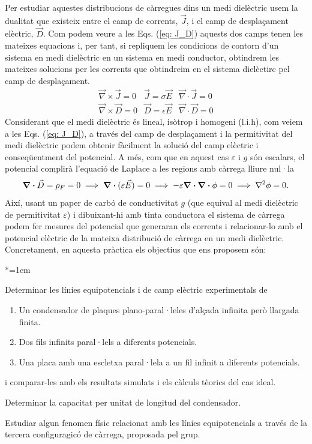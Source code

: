 \documentclass[11pt]{article}
\numberwithin{equation}{section}
\numberwithin{figure}{section}
\numberwithin{table}{section}
\begin{document}
Per estudiar aquestes distribucions de càrregues dins un medi dielèctric usem la dualitat que existeix entre el camp de corrents, $\vec{J}$, i el camp de desplaçament elèctric, $\vec{D}$. Com podem veure a les Eqs. (\ref{eq: J_D}) aquests dos camps tenen les mateixes equacions i, per tant, si repliquem les condicions de contorn d'un sistema en medi dielèctric en un sistema en medi conductor, obtindrem les mateixes solucions per les corrents que obtindreim en el sistema dielèctirc pel camp de desplaçament.
\begin{equation}
    \begin{array}{lll}
    \vec{\nabla} \times \vec{J}=0 & \vec{J}=\sigma \vec{E} & \vec{\nabla} \cdot \vec{J}=0 \\
    \vec{\nabla} \times \vec{D}=0 & \vec{D}=\epsilon \vec{E} & \vec{\nabla} \cdot \vec{D}=0
    \end{array}
    \label{eq: J_D}
\end{equation}
Considerant que el medi dielèctric és lineal, isòtrop i homogeni (l.i.h), com veiem a les Eqs. (\ref{eq: J_D}), a través del camp de desplaçament i la permitivitat del medi dielèctric podem obtenir fàcilment la solució del camp elèctric i conseqüentment del potencial. A més, com que en aquest cas $\varepsilon$ i $g$ són escalars, el potencial complirà l'equació de Laplace a les regions amb càrrega lliure nul·la
\begin{equation}
    \div{\vec{D}}=\rho_F=0 \implies \div{(\varepsilon\vec{E})}=0\implies-\varepsilon\div{\div{\phi}}=0\implies\laplacian{\phi}=0.
\end{equation}
Així, usant un paper de carbó de conductivitat $g$ (que equival al medi dielèctric de permitivitat $\varepsilon$) i dibuixant-hi amb tinta conductora el sistema de càrrega podem fer mesures del potencial que generaran els corrents i relacionar-lo amb el potencial elèctric de la mateixa distribució de càrrega en un medi dielèctric.
Concretament, en aquesta pràctica els objectius que ens proposem són:
\begin{list}{$\ast$}{\leftmargin=1em}
    \item Determinar les línies equipotencials i de camp elèctric experimentals de
        \begin{enumerate}{\leftmargin=1em}
            \item  Un condensador de plaques plano-paral·leles d'alçada infinita però llargada finita.
            \item  Dos fils infinits paral·lels a diferents potencials.
            \item  Una placa amb una escletxa paral·lela a un fil infinit a diferents potencials.
        \end{enumerate}  
        i comparar-les amb els resultats simulats i els càlculs tèorics del cas ideal.
    \item Determinar la capacitat per unitat de longitud del condensador.
    \item Estudiar algun fenomen físic relacionat amb les línies equipotencials a través de la tercera configuragicó de càrrega, proposada pel grup.
\end{list}
\end{document}
